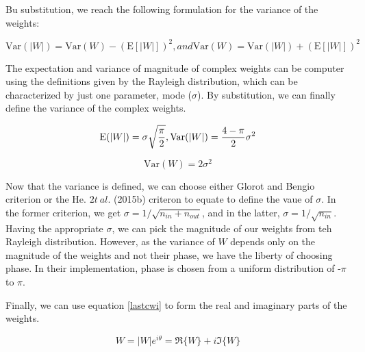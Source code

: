  Bu substitution, we reach the following formulation for the variance of the weights:
 
 \begin{equation}\label{varw2}
 \mathrm{Var}(|W|) = \mathrm{Var}(W)-(\mathrm{E}[|W|])^2 , and  
 \mathrm{Var}(W) = \mathrm{Var}(|W|) + (\mathrm{E}[|W|])^2
 \end{equation}
  
 The expectation and variance of magnitude of complex weights can be computer using the definitions given by the Rayleigh distribution, which can be characterized by just one parameter, mode ($\sigma$). By substitution, we can finally define the variance of the complex weights.
 
 \begin{equation}\label{ray1}
 \mathrm{E}(|W|) = \sigma\sqrt{\frac{\pi}{2}},\\  
 \mathrm{Var}(|W|) = \frac{4-\pi}{2}\sigma^{2}
 \end{equation}
 
 
 \begin{equation}\label{ray2}
 \mathrm{Var}(W) = 2\sigma^2
 \end{equation}
 
 Now that the variance is defined,  we can choose either Glorot and Bengio criterion or the He. $2t \ al.$ (2015b) criteron to equate to define the vaue of $\sigma$. In the former criterion, we get $\sigma = 1/\sqrt{n_{in}+n_{out}}$, and in the latter, $\sigma = 1/\sqrt{n_{in}}$. Having the appropriate $\sigma$, we can pick the magnitude of our weights from teh Rayleigh distribution. However, as the variance of $W$ depends only on the magnitude of the weights and not their phase,  we have the liberty of choosing phase. In their implementation, phase is chosen from a uniform distribution of -$\pi$ to $\pi$.
 
 Finally, we can use equation \ref{lastcwi} to form the real and imaginary parts of the weights.
 
 \begin{equation}\label{lastcwi}
 W = |W|e^{i\theta} = \Re\{W\}+i\Im\{W\}
 \end{equation}
 
 
 
 
 
